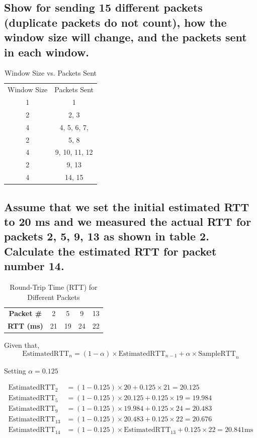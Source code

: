 \documentclass{article}
\begin{document}
\subsection{Show for sending 15 different packets (duplicate packets do not count), how the
window size will change, and the packets sent in each window.}

	\begin{table}[h]
		\centering
		\begin{tabular}{cc}
			Window Size & Packets Sent \\
			1 & 1 \\
			2 & 2, 3 \\
			4 & 4, 5, 6, 7, \\
			2 & 5, 8 \\
			4 & 9, 10, 11, 12 \\
			2 & 9, 13 \\
			4 & 14, 15 \\
		\end{tabular}
		\caption{Window Size vs. Packets Sent}
		\label{tab:window_packets}
	\end{table}

\subsection{Assume that we set the initial estimated RTT to 20 ms and we measured the
actual RTT for packets 2, 5, 9, 13 as shown in table 2. Calculate the estimated RTT for
packet number 14.}

	\begin{table}[h]
		\centering
		\begin{tabular}{ccccc}
			\textbf{Packet \#} & 2  & 5  & 9  & 13 \\
			\textbf{RTT (ms)}  & 21 & 19 & 24 & 22 \\
		\end{tabular}
		\caption{Round-Trip Time (RTT) for Different Packets}
		\label{tab:rtt_data}
	\end{table}

	Given that,
	\[
		\text{EstimatedRTT}_n = (1 - \alpha) \times \text{EstimatedRTT}_{n-1} + \alpha \times \text{SampleRTT}_n
	\]

	Setting $\alpha=0.125$

	\[
		\begin{aligned}
			\text{EstimatedRTT}_2 &= (1 - 0.125) \times 20 + 0.125 \times 21 = 20.125 \\
			\text{EstimatedRTT}_5 &= (1 - 0.125) \times 20.125 + 0.125 \times 19 = 19.984 \\
			\text{EstimatedRTT}_9 &= (1 - 0.125) \times 19.984 + 0.125 \times 24 = 20.483 \\
			\text{EstimatedRTT}_{13} &= (1 - 0.125) \times 20.483 + 0.125 \times 22 = 20.676 \\
			\hline
			\text{EstimatedRTT}_{14} &= (1 - 0.125) \times \text{EstimatedRTT}_{13}  + 0.125 \times 22 = 20.841 \text{ms}
		\end{aligned}
	\]
\end{document}
